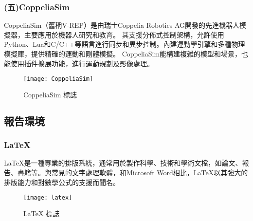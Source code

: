 \subsubsection{(五)CoppeliaSim}
CoppeliaSim（舊稱V-REP）是由瑞士Coppelia Robotics AG開發的先進機器人模擬器，主要應用於機器人研究和教育。
其支援分佈式控制架構，允許使用Python、Lua和C/C++等語言進行同步和異步控制。內建運動學引擎和多種物理模擬庫，提供精確的運動和剛體模擬。
CoppeliaSim能構建複雜的模型和場景，也能使用插件擴展功能，進行運動規劃及影像處理。\\

\begin{figure}[hbt!]
\center
\texttt{[image: CoppeliaSim]}
\caption{\Large CoppeliaSim 標誌}
\end{figure}



\subsection{報告環境}

\subsubsection{LaTeX}

LaTeX是一種專業的排版系統，通常用於製作科學、技術和學術文檔，如論文、報告、書籍等。與常見的文字處理軟體，和Microsoft Word相比，LaTeX以其強大的排版能力和對數學公式的支援而聞名。
\begin{figure}[hbt!]
\center
\texttt{[image: latex]}
\caption{\Large LaTeX 標誌}
\end{figure}
\newpage

\renewcommand{\baselinestretch}{0.5} %